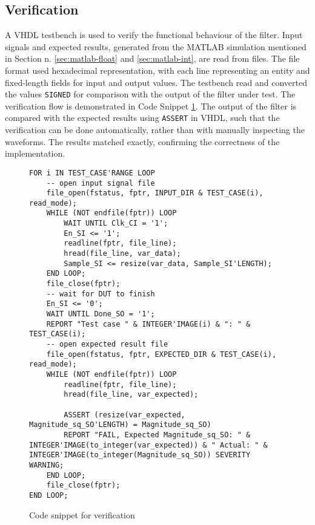 \subsection{Verification} \label{sec:testbench}

A VHDL testbench is used to verify the functional behaviour of the filter. Input signals and expected results, generated from the MATLAB simulation mentioned in Section n. \ref{sec:matlab-float} and \ref{sec:matlab-int}, are read from files. The file format used hexadecimal representation, with each line representing an entity and fixed-length fields for input and output values. The testbench read and converted the values \texttt{SIGNED} for comparison with the output of the filter under test. The verification flow is demonstrated in Code Snippet \ref{code:testbench}.
The output of the filter is compared with the expected results using \texttt{ASSERT} in VHDL, such that the verification can be done automatically, rather than with manually inspecting the waveforms. The results matched exactly, confirming the correctness of the implementation.

\lstset{language=VHDL}
\begin{figure}[H]
\begin{lstlisting}
FOR i IN TEST_CASE'RANGE LOOP
    -- open input signal file
    file_open(fstatus, fptr, INPUT_DIR & TEST_CASE(i), read_mode);
    WHILE (NOT endfile(fptr)) LOOP
        WAIT UNTIL Clk_CI = '1';
        En_SI <= '1';
        readline(fptr, file_line);
        hread(file_line, var_data);
        Sample_SI <= resize(var_data, Sample_SI'LENGTH);
    END LOOP;
    file_close(fptr);
    -- wait for DUT to finish
    En_SI <= '0';
    WAIT UNTIL Done_SO = '1';
    REPORT "Test case " & INTEGER'IMAGE(i) & ": " & TEST_CASE(i);
    -- open expected result file
    file_open(fstatus, fptr, EXPECTED_DIR & TEST_CASE(i), read_mode);
    WHILE (NOT endfile(fptr)) LOOP
        readline(fptr, file_line);
        hread(file_line, var_expected);

        ASSERT (resize(var_expected, Magnitude_sq_SO'LENGTH) = Magnitude_sq_SO)
        REPORT "FAIL, Expected Magnitude_sq_SO: " & INTEGER'IMAGE(to_integer(var_expected)) & " Actual: " & INTEGER'IMAGE(to_integer(Magnitude_sq_SO)) SEVERITY WARNING;
    END LOOP;
    file_close(fptr);
END LOOP;
\end{lstlisting}
\caption{\label{code:testbench}Code snippet for verification}
\end{figure}